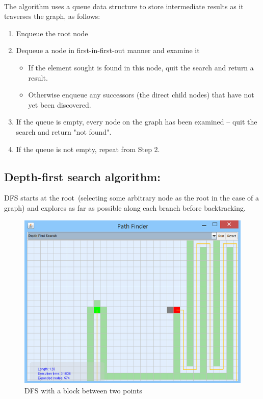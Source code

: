 \documentclass[a4paper]{article}
\begin{document}
\noindent \\
The algorithm uses a queue data structure to store intermediate results as it traverses the graph, as follows:\\

\begin{enumerate}
\item Enqueue the root node
\item Dequeue a node in first-in-first-out manner and examine it
	\begin{itemize}
		\item If the element sought is found in this node, quit the search and return a result.
		\item Otherwise enqueue any successors (the direct child nodes) that have not yet been discovered.
	\end{itemize}
\item If the queue is empty, every node on the graph has been examined – quit the search and return "not found". \\
\item If the queue is not empty, repeat from Step 2.
\end{enumerate}


\subsection{Depth-first search algorithm:}

DFS starts at the root (selecting some arbitrary node as the root in the case of a graph) and explores as far as possible along each branch before backtracking. \\

\begin{figure}[h!]
  \centering
    \includegraphics[scale=.9]{images/dfs1.png}
  \caption{DFS with a block between two points}
\end{figure}
\end{document}
